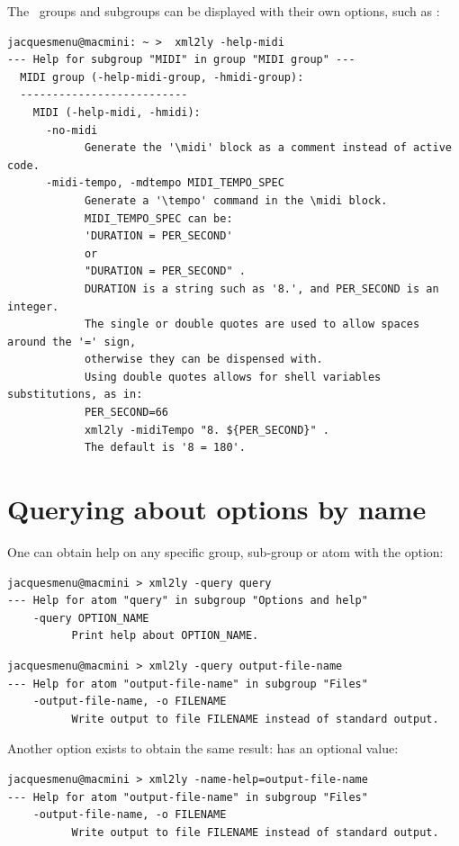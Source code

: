 The \oahRepr\ groups and subgroups can be displayed with their own options, such as :
\begin{lstlisting}[language=Terminal]
jacquesmenu@macmini: ~ >  xml2ly -help-midi
--- Help for subgroup "MIDI" in group "MIDI group" ---
  MIDI group (-help-midi-group, -hmidi-group):
  --------------------------
    MIDI (-help-midi, -hmidi):
      -no-midi
            Generate the '\midi' block as a comment instead of active code.
      -midi-tempo, -mdtempo MIDI_TEMPO_SPEC
            Generate a '\tempo' command in the \midi block.
            MIDI_TEMPO_SPEC can be:
            'DURATION = PER_SECOND'
            or
            "DURATION = PER_SECOND" .
            DURATION is a string such as '8.', and PER_SECOND is an integer.
            The single or double quotes are used to allow spaces around the '=' sign,
            otherwise they can be dispensed with.
            Using double quotes allows for shell variables substitutions, as in:
            PER_SECOND=66
            xml2ly -midiTempo "8. ${PER_SECOND}" .
            The default is '8 = 180'.
\end{lstlisting}


\section{Querying about options by name}\label{Querying about options by name}

One can obtain help on any specific group, sub-group or atom with the  option:
\begin{lstlisting}[language=Terminal]
jacquesmenu@macmini > xml2ly -query query
--- Help for atom "query" in subgroup "Options and help"
    -query OPTION_NAME
          Print help about OPTION_NAME.
\end{lstlisting}

\begin{lstlisting}[language=Terminal]
jacquesmenu@macmini > xml2ly -query output-file-name
--- Help for atom "output-file-name" in subgroup "Files"
    -output-file-name, -o FILENAME
          Write output to file FILENAME instead of standard output.
\end{lstlisting}

Another option exists to obtain the same result:  has an optional value:
\begin{lstlisting}[language=Terminal]
jacquesmenu@macmini > xml2ly -name-help=output-file-name
--- Help for atom "output-file-name" in subgroup "Files"
    -output-file-name, -o FILENAME
          Write output to file FILENAME instead of standard output.
\end{lstlisting}

